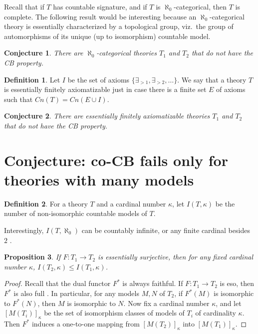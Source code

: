 \documentclass[12pt]{article}
\newtheorem{prop}{Proposition}
\newtheorem{conj}[prop]{Conjecture}
\theoremstyle{definition}
\newtheorem*{defn}{Definition}
\theoremstyle{remark}
\newcommand{\3}{\mathcal}
\begin{document}
Recall that if $T$ has countable signature, and if $T$ is
$\aleph _0$-categorical, then $T$ is complete. The following result
would be interesting because an $\aleph _0$-categorical theory is
essentially characterized by a topological group, viz.\ the group of
automorphisms of its unique (up to isomorphism) countable model.


\begin{conj} There are $\aleph _0$-categorical theories $T_1$ and
  $T_2$ that do not have the CB property. \end{conj}

\begin{defn} Let $I$ be the set of axioms
  $\{ \exists _{>1},\exists _{>2},\dots \}$. We say that a theory $T$
  is essentially finitely axiomatizable just in case there is a finite
  set $E$ of axioms such that $Cn(T)=Cn(E\cup I)$. \end{defn}

\begin{conj} There are essentially finitely axiomatizable theories
  $T_1$ and $T_2$ that do not have the CB property. \end{conj}

\section{Conjecture: co-CB fails only for theories with many models}

\begin{defn} For a theory $T$ and a cardinal number $\kappa$, let
  $I(T,\kappa )$ be the number of non-isomorphic countable models of
  $T$. \end{defn}

Interestingly, $I(T,\aleph _0)$ can be countably infinite, or any
finite cardinal besides $2$ \citep[see][p 155ff]{marker2006}.

\begin{prop} If $F:T_1\to T_2$ is essentially surjective, then for any
  fixed cardinal number $\kappa$,
  $I(T_2, \kappa )\leq I(T_1, \kappa )$. \end{prop}

\begin{proof} Recall that the dual functor $F^*$ is always
  faithful. If $F:T_1\to T_2$ is eso, then $F^*$ is also full
  \citep[Prop 6.6.13]{tlps}. In particular, for any models $M,N$ of
  $T_2$, if $F^*(M)$ is isomorphic to $F^*(N)$, then $M$ is isomorphic
  to $N$. Now fix a cardinal number $\kappa$, and let
  $[M(T_i)]_\kappa$ be the set of isomorphism classes of models of
  $T_i$ of cardinality $\kappa$. Then $F^*$ induces a one-to-one
  mapping from $[M(T_2)]_\kappa$ into $[M(T_1)]_\kappa$. \end{proof}
\end{document}
